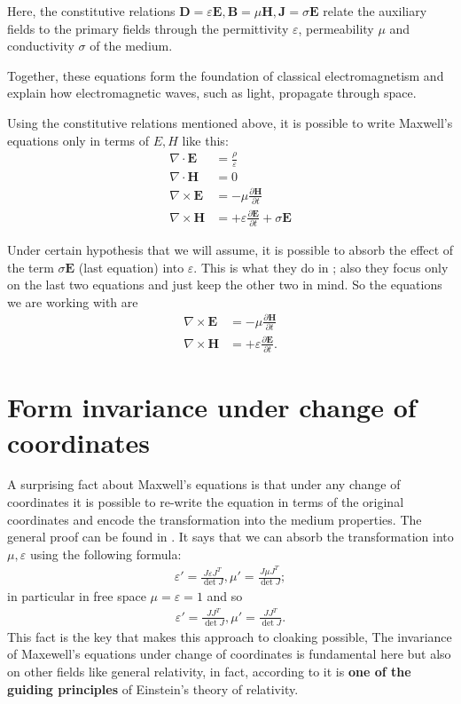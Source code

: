 \documentclass{amsart}
\begin{document}
Here, the constitutive relations \(\mathbf{D} = \varepsilon \mathbf{E},
\mathbf{B}=\mu \mathbf{H},\mathbf{J}=\sigma \mathbf{E}\) relate the auxiliary fields to the primary fields 
through the permittivity \(\varepsilon\), permeability \(\mu\) and conductivity \(\sigma\) of the medium.

Together, these equations form the foundation of classical electromagnetism and explain how electromagnetic waves, such as light, propagate through space.

\newpage

Using the constitutive relations mentioned above, it is possible to write Maxwell's equations only in terms of \(E,H\) like this:
\begin{align*}
  \nabla \cdot \mathbf{E} &=\frac{\rho}{\varepsilon}\\
  \nabla \cdot \mathbf{H} &=0\\
  \nabla \times \mathbf{E} &= -\mu\frac{\partial \mathbf{H}}{\partial t}\\
  \nabla \times \mathbf{H} &= +\varepsilon\frac{\partial \mathbf{E}}{\partial t} + \sigma \mathbf{E}
\end{align*}

Under certain hypothesis that we will assume, it is possible to absorb the effect of
the term \(\sigma\mathbf{E}\) (last equation) into \(\varepsilon\).
This is what they do in \cite{ward96}; also they focus only on the last two equations and just keep the other two in mind.
So the equations we are working with are
\begin{align*}
  \nabla \times \mathbf{E} &= -\mu\frac{\partial \mathbf{H}}{\partial t}\\
  \nabla \times \mathbf{H} &= +\varepsilon\frac{\partial \mathbf{E}}{\partial t}.
\end{align*}

\section{Form invariance under change of coordinates} A surprising fact about Maxwell's equations is that under any change of
coordinates it is possible to re-write the equation in terms of the original coordinates and encode the transformation into
the medium properties. The general proof can be found in \cite{Johnson08}.
It says that we can absorb the transformation into \(\mu,\varepsilon\) using the following formula:
\begin{align}
\varepsilon'=\frac{J\varepsilon J^T}{\det J},\mu'=\frac{J\mu J^T}{\det J};
\end{align}
in particular in free space \(\mu=\varepsilon=1\) and so
\begin{align}
\varepsilon'=\frac{JJ^T}{\det J},\mu'=\frac{JJ^T}{\det J}.
\end{align}
This fact is the key that makes this approach to cloaking possible,
The invariance of Maxewell's equations under change of coordinates is fundamental here but also
on other fields like general relativity, in fact, according to \cite{thompson12} it is \textbf{one of the guiding principles}
of Einstein's theory of relativity.
\end{document}
